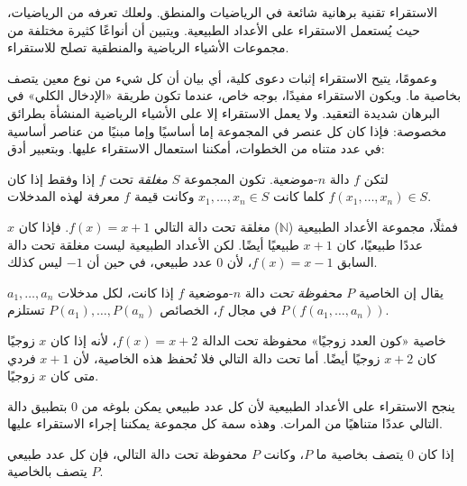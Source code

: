 \documentclass[../../../include/open-logic-section]{subfiles}
\begin{document}


\begin{explain}
الاستقراء تقنية برهانية شائعة في الرياضيات والمنطق. ولعلك تعرفه من
الرياضيات، حيث يُستعمل الاستقراء على الأعداد الطبيعية. ويتبين أن أنواعًا
كثيرة مختلفة من مجموعات الأشياء الرياضية والمنطقية تصلح للاستقراء.

وعمومًا، يتيح الاستقراء إثبات دعوى كلية، أي بيان أن كل شيء من نوع معين
يتصف بخاصية ما. ويكون الاستقراء مفيدًا، بوجه خاص، عندما تكون طريقة
«الإدخال الكلي» في البرهان شديدة التعقيد. ولا يعمل الاستقراء إلا على
الأشياء الرياضية المنشأة بطرائق مخصوصة: فإذا كان كل عنصر في المجموعة
إما أساسيًا وإما مبنيًا من عناصر أساسية في عدد متناه من الخطوات، أمكننا
استعمال الاستقراء عليها. وبتعبير أدق:
\end{explain}

\begin{defn}
لتكن $f$ دالة $n$-موضعية. تكون المجموعة $S$ \emph{مغلقة} تحت $f$
إذا وفقط إذا كان $f(x_1,\dots,x_n) \in S$ كلما كانت
$x_1,\dots,x_n \in S$ وكانت قيمة $f$ معرفة لهذه المدخلات.
\end{defn}

\begin{explain}
فمثلًا، مجموعة الأعداد الطبيعية ($\mathbb{N}$) مغلقة تحت دالة التالي
$f(x) = x+1$. فإذا كان $x$ عددًا طبيعيًا، كان $x+1$ طبيعيًا أيضًا.
لكن الأعداد الطبيعية ليست مغلقة تحت دالة السابق $f(x) = x-1$، لأن
$0$ عدد طبيعي، في حين أن $-1$ ليس كذلك.
\end{explain}

\begin{defn}
يقال إن الخاصية $P$ \emph{محفوظة تحت} دالة $n$-موضعية $f$ إذا كانت،
لكل مدخلات $a_1,\dots,a_n$ في مجال $f$، الخصائص
$P(a_1),\dots,P(a_n)$ تستلزم $P(f(a_1,\dots,a_n))$.
\end{defn}

\begin{explain}
خاصية «كون العدد زوجيًا» محفوظة تحت الدالة $f(x) = x+2$، لأنه إذا
كان $x$ زوجيًا كان $x+2$ زوجيًا أيضًا. أما تحت دالة التالي فلا تُحفظ
هذه الخاصية، لأن $x+1$ فردي متى كان $x$ زوجيًا.

ينجح الاستقراء على الأعداد الطبيعية لأن كل عدد طبيعي يمكن بلوغه من
$0$ بتطبيق دالة التالي عددًا متناهيًا من المرات. وهذه سمة كل مجموعة
يمكننا إجراء الاستقراء عليها.
\end{explain}

\begin{defn}
إذا كان $0$ يتصف بخاصية ما $P$، وكانت $P$ محفوظة تحت دالة التالي،
فإن كل عدد طبيعي يتصف بالخاصية $P$.
\end{defn}
\end{document}
